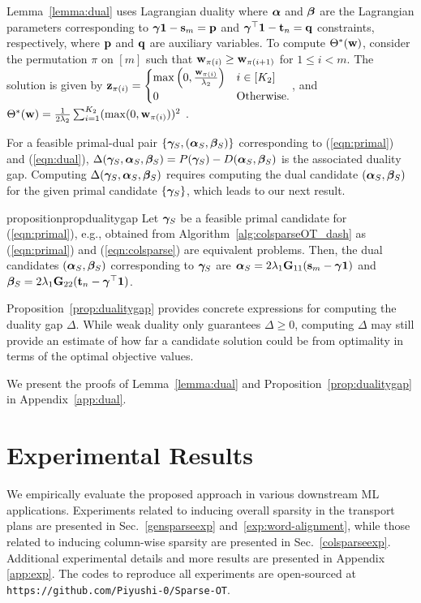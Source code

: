 Lemma~\ref{lemma:dual} uses Lagrangian duality where $\bm{\alpha}$ and $\bm{\beta}$ are the Lagrangian parameters corresponding to $\bm{\gamma}\mathbf{1}-\mathbf{s}_m =\mathbf{p}$ and $\bm{\gamma}^\top\mathbf{1}-\mathbf{t}_n =\mathbf{q}$ constraints, respectively, where $\mathbf{p}$ and $\mathbf{q}$ are auxiliary variables. To compute $\Theta^*(\mathbf{w})$, consider the permutation $\pi$ on $[m]$ such that $\mathbf{w}_{\pi(i)} \geq \mathbf{w}_{\pi(i+1)}$ for $1\leq i < m$. The solution is given by $\mathbf{z}_{\pi(i)} =\begin{cases}
    \max\left(0, \frac{\mathbf{w}_{\pi(i)}}{\lambda_2} \right) & i \in [K_2]\\
    0 & \textup{Otherwise}.
\end{cases}$, and $\Theta^{*}(\mathbf{w})=\frac{1}{2\lambda_2}\sum_{i=1}^{K_2} (\max(0,\mathbf{w}_{\pi(i)}))^2$ \citep{liu2023sparsityconstrained}. 

For a feasible primal-dual pair $\{\bm{\gamma}_S,(\bm{\alpha}_S,\bm{\beta}_S)\}$ corresponding to (\ref{eqn:primal}) and (\ref{eqn:dual}), 
$\Delta(\bm{\gamma}_S,\bm{\alpha}_S,\bm{\beta}_S) = P(\bm{\gamma}_S)-D(\bm{\alpha}_S,\bm{\beta}_S)$ is the associated duality gap. Computing $\Delta(\bm{\gamma}_S,\bm{\alpha}_S,\bm{\beta}_S)$ requires computing the dual candidate $(\bm{\alpha}_S,\bm{\beta}_S)$ for the given primal candidate $\{\bm{\gamma}_S\}$, which leads to our next result. 
\begin{lemmaBox}
\begin{restatable}{proposition}{propdualitygap}\label{prop:dualitygap}
    Let $\bm{\gamma}_S$ be a feasible primal candidate for (\ref{eqn:primal}), e.g., obtained from Algorithm~\ref{alg:colsparseOT_dash} as (\ref{eqn:primal}) and (\ref{eqn:colsparse}) are equivalent problems. Then, the dual candidates $(\bm{\alpha}_S,\bm{\beta}_S)$ corresponding to $\bm{\gamma}_S$ are $\bm{\alpha}_S = 2\lambda_1\mathbf{G}_{11}(\mathbf{s}_m-\bm{\gamma}\mathbf{1})$ and $\bm{\beta}_S = 2\lambda_1\mathbf{G}_{22}(\mathbf{t}_n-\bm{\gamma}^\top\mathbf{1})$.
\end{restatable}
\end{lemmaBox}
Proposition~\ref{prop:dualitygap} provides concrete expressions for computing the duality gap $\Delta$. While weak duality only guarantees $\Delta\geq 0$, computing $\Delta$ may still provide an estimate of how far a candidate solution could be from optimality in terms of the optimal objective values.

\noindent We present the proofs of Lemma~\ref{lemma:dual} and Proposition~\ref{prop:dualitygap} in Appendix~\ref{app:dual}.
\section{Experimental Results}\label{sec:sot-expt}
We empirically evaluate the proposed approach in various downstream ML applications. Experiments related to inducing overall sparsity in the transport plans are presented in Sec.~\ref{gensparseexp} and~\ref{exp:word-alignment}, while those related to inducing column-wise sparsity are presented in Sec.~\ref{colsparseexp}. 
Additional experimental details and more results are presented in Appendix \ref{app:exp}. The codes to reproduce all experiments are open-sourced at \texttt{https://github.com/Piyushi-0/Sparse-OT}.


